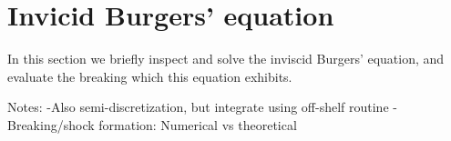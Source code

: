 \begin{figure}[ht]
    \centering
    
    \label{fig:2b-convergence}
\end{figure}


%
%    

\section{Invicid Burgers' equation}

In this section we briefly inspect and solve the inviscid Burgers' equation, 
and evaluate the breaking which this equation exhibits. 

Notes:
    -Also semi-discretization, but integrate using off-shelf routine
    -Breaking/shock formation: Numerical vs theoretical

\begin{figure}[ht]
    \centering
    
\end{figure}
